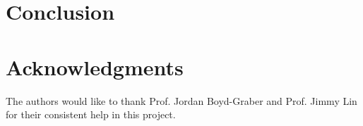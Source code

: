 \documentclass{acm_proc_article-sp}
\begin{document}
\section{Conclusion}\label{sec:con}

\section*{Acknowledgments}
The authors would like to thank Prof. Jordan Boyd-Graber and Prof. Jimmy Lin for their consistent help in this project.



\appendix



% 
% 
\end{document}

